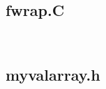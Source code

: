 \texttt{
\small
}

\subsection{fwrap.C}

\texttt{
\small
}

\subsection{myvalarray.h}

\texttt{
\small
}
